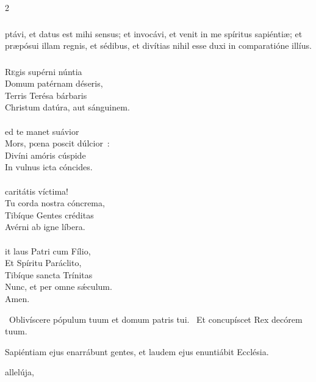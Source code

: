 \documentclass[9pt,twoside]{extarticle}
\begin{document}
\begin{multicols}{2}
{{{\subsubsection*{}
ptávi, et datus est mihi sensus; et invocávi, et venit in me spíritus sapiéntiæ; et præpósui illam regnis, et sédibus, et divítias nihil esse duxi in comparatióne illíus.

\subsubsection*{\center {}}
\begin{center}\end{center}
\lettrine{R}egis supérni núntia\\
Domum patérnam déseris,\\
Terris Terésa bárbaris\\
Christum datúra, aut sánguinem.\\
\\
ed te manet suávior\\
Mors, pœna poscit dúlcior~:\\
Divíni amóris cúspide\\
In vulnus icta cóncides.\\
\\
 caritátis víctima!\\
Tu corda nostra cóncrema,\\
Tibíque Gentes créditas\\
Avérni ab igne líbera.\\
\\
it laus Patri cum Fílio,\\
Et Spíritu Paráclito,\\
Tibíque sancta Trínitas\\
Nunc, et per omne sǽculum.\\
Amen.

\begin{tightlist}{}
\item {}~Oblivíscere pópulum tuum et domum patris tui. ~Et concupíscet Rex decórem tuum.
\item {} Sapiéntiam ejus enarrábunt gentes, et laudem ejus enuntiábit Ecclésia.
\item {} allelúja, 
\end{tightlist}

}}}
\end{multicols}
\end{document}
